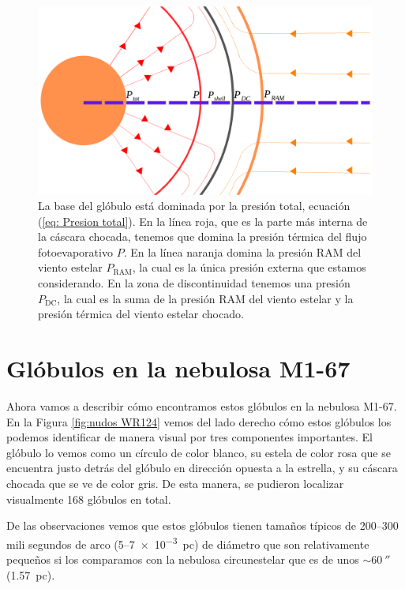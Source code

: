 \documentclass{book}
\begin{document}
\begin{figure}[htb]
    \centering    \includegraphics[width=\textwidth]{imagenes_corregidas/Arreglo 03.pdf}
    \caption{La base del glóbulo está dominada por la presión total,
      ecuación (\ref{eq: Presion total}). En la línea roja, que es la
      parte más interna de la cáscara chocada, tenemos que domina la
      presión térmica del flujo fotoevaporativo $P$. En la línea
      naranja domina la presión RAM del viento estelar
      $P_\mathrm{RAM}$, la cual es la única presión externa que
      estamos considerando. En la zona de discontinuidad tenemos una
      presión $P_\mathrm{DC}$, la cual es la suma de la presión RAM
      del viento estelar y la presión térmica del viento estelar
      chocado. }
    \label{fig:zones_presiones}
\end{figure}




\chapter{Glóbulos en la nebulosa M1-67} \label{Chapter : 3}

Ahora vamos a describir cómo encontramos estos glóbulos en la nebulosa
M1-67. En la Figura \ref{fig:nudos WR124} vemos del lado derecho cómo
estos glóbulos los podemos identificar de manera visual por tres
componentes importantes. El glóbulo lo vemos como un círculo de color
blanco, su estela de color rosa que se encuentra justo detrás del
glóbulo en dirección opuesta a la estrella, y su cáscara chocada que
se ve de color gris. De esta manera, se pudieron localizar visualmente
168 glóbulos en total.

De las observaciones vemos que estos glóbulos tienen tamaños típicos
de 200--300 mili segundos de arco (5--\SI{7e-3}{pc}) de diámetro que son
relativamente pequeños si los comparamos con la nebulosa circunestelar
que es de unos $\sim\SI{60}{\arcsecond}$ (\SI{1.57}{pc}).
\end{document}
